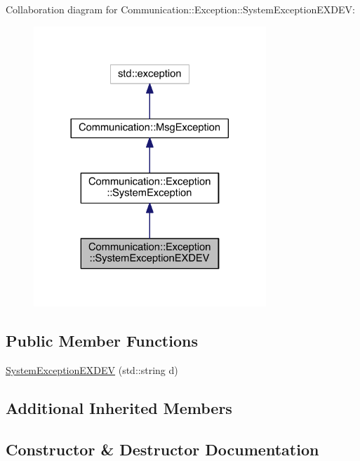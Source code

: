 Collaboration diagram for Communication\+:\+:Exception\+:\+:System\+Exception\+E\+X\+D\+E\+V\+:\nopagebreak
\begin{figure}[H]
\begin{center}
\leavevmode
\includegraphics[width=248pt]{class_communication_1_1_exception_1_1_system_exception_e_x_d_e_v__coll__graph}
\end{center}
\end{figure}
\subsection*{Public Member Functions}
\begin{DoxyCompactItemize}
\item 
\hyperlink{class_communication_1_1_exception_1_1_system_exception_e_x_d_e_v_a40f2a91bdec498e54a9f21b2e8fd069a}{System\+Exception\+E\+X\+D\+E\+V} (std\+::string d)
\end{DoxyCompactItemize}
\subsection*{Additional Inherited Members}


\subsection{Constructor \& Destructor Documentation}
\hypertarget{class_communication_1_1_exception_1_1_system_exception_e_x_d_e_v_a40f2a91bdec498e54a9f21b2e8fd069a}{}
